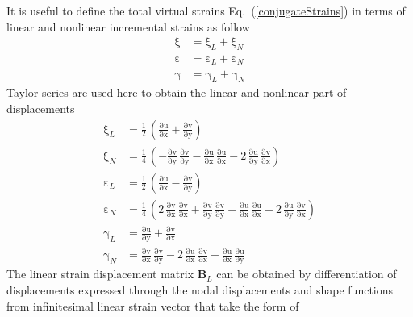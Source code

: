 It is useful to define the total virtual strains Eq.~(\ref{conjugateStrains}) in terms of linear and nonlinear incremental strains as follow
\begin{subequations}
	\begin{align}
	\mathrm  \xi & =\mathrm \xi_{L}+\mathrm  \xi_{N}\\
	\mathrm  \varepsilon & =\mathrm  \varepsilon_{L}+\mathrm  \varepsilon_{N}\\
	\mathrm \gamma & =\mathrm  \gamma_{L}+\mathrm  \gamma_{N}
	\end{align}
	\label{totalvirtualstrain}
\end{subequations}
Taylor series are used here to obtain the linear and nonlinear part of displacements 
\begin{subequations}
	\begin{align}
	\mathrm \xi_{L} & = \frac{1}{2} \, \left(\mathrm{\frac{\partial u}{\partial x}} + \mathrm{\frac{\partial v}{\partial y}}\right)\\
	\mathrm \xi_{N} & = \frac{1}{4} \, \left(- \mathrm{\frac{ \partial v}{\partial y}}\, \mathrm{\frac{ \partial v}{\partial y}} -\mathrm{\frac{\partial u}{\partial x}}\, \mathrm{\frac{\partial u}{\partial x}} - 2 \, \mathrm{\frac{\partial u}{\partial y}}\, \mathrm{\frac{\partial v}{\partial x}}\right)\\
	\mathrm \varepsilon_{L} & = \frac{1}{2} \, \left(\mathrm{\frac{\partial u}{\partial x}} - \mathrm{\frac{\partial v}{\partial y}}\right)\\
	\mathrm \varepsilon_{N} & = \frac{1}{4} \, \left(2 \, \mathrm{\frac{\partial v}{\partial x}}\, \mathrm{\frac{\partial v}{\partial x}} + \mathrm{\frac{ \partial v}{\partial y}}\, \mathrm{\frac{ \partial v}{\partial y}} -\mathrm{\frac{\partial u}{\partial x}}\, \mathrm{\frac{\partial u}{\partial x}} + 2 \, \mathrm{\frac{\partial u}{\partial y}}\, \mathrm{\frac{\partial v}{\partial x}}\right)\\
	\mathrm \gamma_{L} & = \mathrm{\frac{\partial u}{\partial y}} + \mathrm{\frac{\partial v}{\partial x}}\\
	\mathrm \gamma_{N} & = \mathrm{\frac{\partial v}{\partial x}}\, \mathrm{\frac{\partial v}{\partial y}} - 2\, \mathrm{\frac{ \partial u}{\partial x}}\, \mathrm{\frac{ \partial v}{\partial x}} 
	-\mathrm{\frac{\partial u}{\partial x}}\, \mathrm{\frac{\partial u}{\partial y}}
	\end{align}
\end{subequations}
The linear strain displacement matrix $\mathbf{B}_L$ can be obtained by differentiation of displacements expressed through the nodal displacements and shape functions from infinitesimal linear strain vector that take the form of
